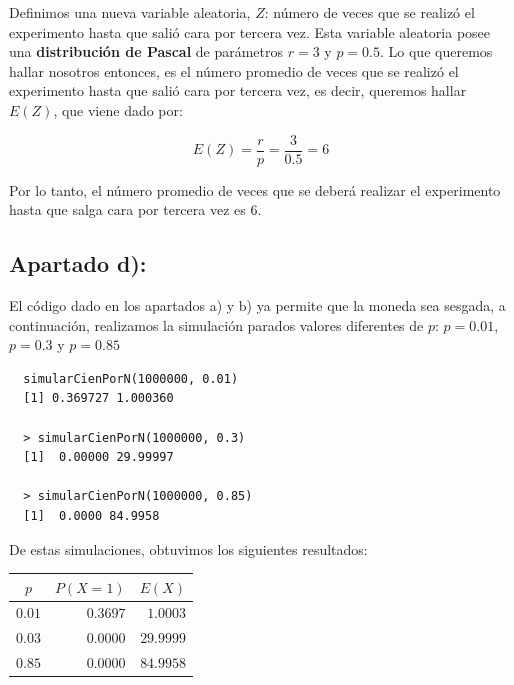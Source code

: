 \documentclass[11pt]{article}
\begin{document}
Definimos una nueva variable aleatoria, $ Z $: número de veces que se realizó el
experimento hasta que salió cara por tercera vez. Esta variable aleatoria posee
una \textbf{distribución de Pascal} de parámetros $ r = 3 $ y $ p = 0.5 $. Lo que queremos
hallar nosotros entonces, es el número promedio de veces que se realizó el 
experimento hasta que salió cara por tercera vez, es decir, queremos hallar
$ E(Z) $, que viene dado por:

\begin{equation*}
  E(Z) = \frac{r}{p} = \frac{3}{0.5} = 6
\end{equation*}

Por lo tanto, el número promedio de veces que se deberá realizar el experimento hasta
que salga cara por tercera vez es 6.


\subsection*{Apartado d):}

El código dado en los apartados a) y b) ya permite que la moneda sea sesgada,
a continuación, realizamos la simulación parados valores diferentes de $ p $:
$ p = 0.01 $, $ p = 0.3 $ y $ p = 0.85 $

\begin{verbatim}
  simularCienPorN(1000000, 0.01)
  [1] 0.369727 1.000360

  > simularCienPorN(1000000, 0.3)
  [1]  0.00000 29.99997

  > simularCienPorN(1000000, 0.85)
  [1]  0.0000 84.9958
\end{verbatim}

De estas simulaciones, obtuvimos los siguientes resultados:

\begin{table}[h!]
  \begin{center}
    \begin{tabular}{| c | r | r |}
      \hline
      $ p $ & $ P(X = 1) $ & $ E(X) $ \\ \hline
      $ 0.01 $ & $ 0.3697 $ & $ 1.0003 $ \\ \hline
      $ 0.03 $ & $ 0.0000 $ & $ 29.9999 $ \\ \hline
      $ 0.85 $ & $ 0.0000 $ & $ 84.9958 $ \\ \hline 
    \end{tabular}
  \end{center}
\end{table}
\end{document}
